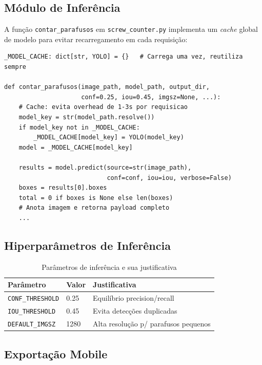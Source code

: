 \documentclass[12pt,a4paper]{article}
\begin{document}
\subsection{M\'odulo de Infer\^encia}

A fun\c{c}\~ao \texttt{contar\_parafusos} em \texttt{screw\_counter.py} implementa
um \emph{cache} global de modelo para evitar recarregamento em cada requisi\c{c}\~ao:

\begin{lstlisting}[caption={Infer\^encia com cache de modelo (\texttt{screw\_counter.py})}]
_MODEL_CACHE: dict[str, YOLO] = {}   # Carrega uma vez, reutiliza sempre

def contar_parafusos(image_path, model_path, output_dir,
                     conf=0.25, iou=0.45, imgsz=None, ...):
    # Cache: evita overhead de 1-3s por requisicao
    model_key = str(model_path.resolve())
    if model_key not in _MODEL_CACHE:
        _MODEL_CACHE[model_key] = YOLO(model_key)
    model = _MODEL_CACHE[model_key]

    results = model.predict(source=str(image_path),
                            conf=conf, iou=iou, verbose=False)
    boxes = results[0].boxes
    total = 0 if boxes is None else len(boxes)
    # Anota imagem e retorna payload completo
    ...
\end{lstlisting}

\subsection{Hiperpar\^ametros de Infer\^encia}

\begin{table}[H]
  \centering
  \caption{Par\^ametros de infer\^encia e sua justificativa}
  \label{tab:hiper}
  \begin{tabular}{lll}
    \toprule
    \textbf{Par\^ametro} & \textbf{Valor} & \textbf{Justificativa} \\
    \midrule
    \texttt{CONF\_THRESHOLD} & 0.25 & Equil\'ibrio precision/recall \\
    \texttt{IOU\_THRESHOLD}  & 0.45 & Evita detec\c{c}\~oes duplicadas \\
    \texttt{DEFAULT\_IMGSZ}  & 1280 & Alta resolu\c{c}\~ao p/ parafusos pequenos \\
    \bottomrule
  \end{tabular}
\end{table}

\subsection{Exporta\c{c}\~ao Mobile}
\end{document}
